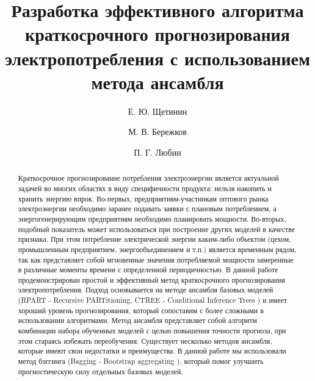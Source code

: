 \documentclass[60x84/16,8pt]{ittmm}
\begin{document}

\title{Разработка эффективного алгоритма краткосрочного прогнозирования
  электропотребления с использованием метода ансамбля}

\author[1]{Е. Ю. Щетинин}
\author[2]{М. В. Бережков}
\author[2]{П. Г. Любин}

\address[1]{Всероссийский научно-исследовательский институт\\
  по проблемам гражданской обороны  и чрезвычайных ситуаций\\
  МЧС России (федеральный центр науки и высоких технологий)\\
  ул. Давыдковская, д.7, Москва, Россия, 121352}
\address[2]{Федеральное государственное бюджетное образовательное учреждение\\
  Высшего образования\\
  Московский государственный технологический университет ``СТАНКИН''\\
  пер. Вадковский, д.3а, Москва, Россия, 127055}


\begin{abstract}
Краткосрочное прогнозирование потребления электроэнергии является актуальной
задачей во многих областях в виду специфичности продукта: нельзя накопить и
хранить энергию впрок. Во-первых, предприятиям-участникам оптового рынка
электроэнергии необходимо заранее подавать заявки с плановым потреблением, а
энергогенерирующим предприятиям необходимо планировать мощности. Во-вторых,
подобный показатель может использоваться при построение других моделей в
качестве признака. При этом потребление электрической энергии каким-либо
объектом (цехом, промышленным предприятием, энергообъединением и т.п.) является
временным рядом, так как представляет собой мгновенные значения потребляемой
мощности замеренные в различные моменты времени с определенной периодичностью. В
данной работе продемонстрирован простой и эффективный метод краткосрочного
прогнозирования электропотребления. Подход основывается на методе ансамбля
базовых моделей (RPART - Recursive PARTitioning, CTREE - Conditional Inference
Trees \cite{BreimanEtAl}) и имеет хороший уровень прогнозирования, который
сопоставим с более сложными в использовании алгоритмами. Метод ансамбля
представляет собой алгоритм комбинации набора обученных моделей с целью
повышения точности прогноза, при этом стараясь избежать переобучения. Существует
несколько методов ансамбля, которые имеют свои недостатки и преимущества. В
данной работе мы использовали метод бэггинга (Bagging - Bootstrap aggregating
\cite{Breiman1996}), который помог улучшить прогностическую силу отдельных
базовых моделей.
\end{abstract}
\end{document}
